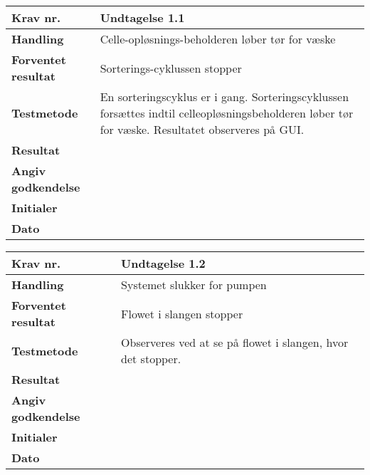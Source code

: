 \begin{center}
		\begin{longtable}{ | m{4cm}| m{8.5cm}|} 
			\hline
			\textbf{Krav nr.} & Undtagelse 1.1  \\ 
			\hline
			\textbf{Handling} & Celle-opløsnings-beholderen løber tør for væske   \\
			\hline
			\textbf{Forventet resultat} & Sorterings-cyklussen stopper \\
			\hline
			\textbf{Testmetode}  & En sorteringscyklus er i gang. Sorteringscyklussen forsættes indtil celleopløsningsbeholderen løber tør for væske. Resultatet observeres på GUI.  \\
			\hline
			\textbf{Resultat}  &    \\
			\hline
			\textbf{Angiv godkendelse} &     \\
			\hline
			\textbf{Initialer} &     \\
			\hline
			\textbf{Dato} &    \\
			\hline
		\end{longtable}
	\end{center}
	
\newpage	
			
	\begin{center}
		\begin{longtable}{ | m{4cm}| m{8.5cm}|} 
			\hline
			\textbf{Krav nr.} & Undtagelse 1.2  \\ 
			\hline
			\textbf{Handling} & Systemet slukker for pumpen   \\
			\hline
			\textbf{Forventet resultat} & Flowet i slangen stopper \\
			\hline
			\textbf{Testmetode}  & Observeres ved at se på flowet i slangen, hvor det stopper. \\
			\hline
			\textbf{Resultat}  &    \\
			\hline
			\textbf{Angiv godkendelse} &     \\
			\hline
			\textbf{Initialer} &     \\
			\hline
			\textbf{Dato} &    \\
			\hline
		\end{longtable}
	\end{center}
			
